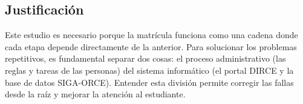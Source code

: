 \subsection{Justificación}
Este estudio es necesario porque la matrícula funciona como una cadena donde cada etapa depende directamente de la anterior. Para solucionar los problemas repetitivos, es fundamental separar dos cosas: el proceso administrativo (las reglas y tareas de las personas) del sistema informático (el portal DIRCE y la base de datos SIGA-ORCE). Entender esta división permite corregir las fallas desde la raíz y mejorar la atención al estudiante.
